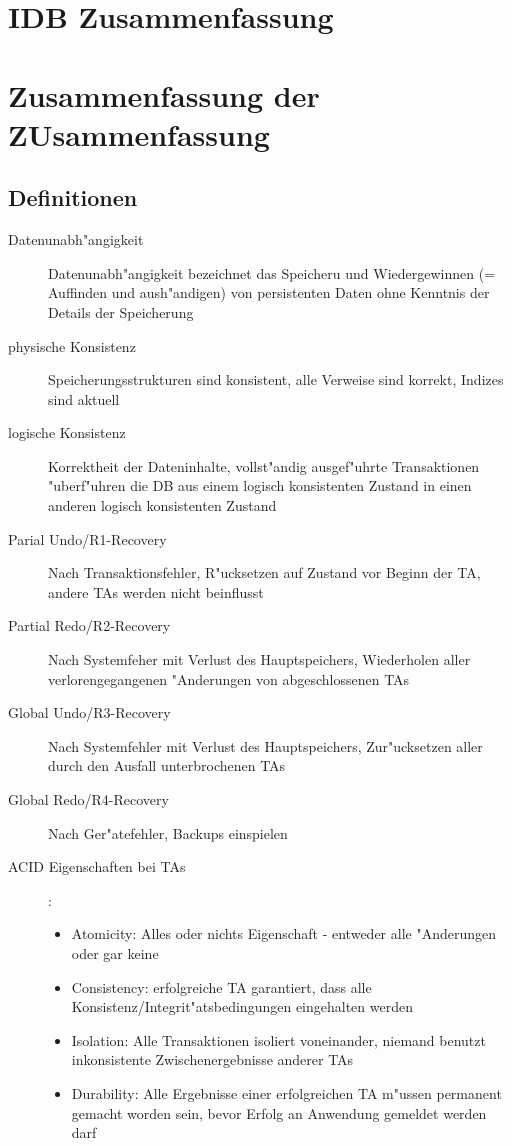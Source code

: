 \documentclass[a4paper, 12pt]{scrartcl}
\begin{document}
\section*{IDB Zusammenfassung}
\tableofcontents

\newpage

\section{Zusammenfassung der ZUsammenfassung}
\subsection{Definitionen}
\begin{description}
	\item[Datenunabh"angigkeit] Datenunabh"angigkeit bezeichnet das Speicheru und Wiedergewinnen (= Auffinden und aush"andigen) von persistenten Daten ohne Kenntnis der Details der Speicherung
	\item[physische Konsistenz] Speicherungsstrukturen sind konsistent, alle Verweise sind korrekt, Indizes sind aktuell
	\item[logische Konsistenz] Korrektheit der Dateninhalte, vollst"andig ausgef"uhrte Transaktionen "uberf"uhren die DB aus einem logisch konsistenten Zustand in einen anderen logisch konsistenten Zustand
	\item
		[Parial Undo/R1-Recovery] Nach Transaktionsfehler, R"ucksetzen auf Zustand vor Beginn der TA, andere TAs werden nicht beinflusst
	\item
		[Partial Redo/R2-Recovery] Nach Systemfeher mit Verlust des Hauptspeichers, Wiederholen aller verlorengegangenen "Anderungen von abgeschlossenen TAs
	\item
		[Global Undo/R3-Recovery] Nach Systemfehler mit Verlust des Hauptspeichers, Zur"ucksetzen aller durch den Ausfall unterbrochenen TAs
	\item
		[Global Redo/R4-Recovery] Nach Ger"atefehler, Backups einspielen
	\item
		[ACID Eigenschaften bei TAs]:
		\begin{itemize}
			\item Atomicity: Alles oder nichts Eigenschaft - entweder alle "Anderungen oder gar keine
			\item Consistency: erfolgreiche TA garantiert, dass alle Konsistenz/Integrit"atsbedingungen eingehalten werden
			\item
				 Isolation: Alle Transaktionen isoliert voneinander, niemand benutzt inkonsistente Zwischenergebnisse anderer TAs
			\item
				 Durability: Alle Ergebnisse einer erfolgreichen TA m"ussen permanent gemacht worden sein, bevor Erfolg an Anwendung gemeldet werden darf
		\end{itemize}

\end{description}
\end{document}
